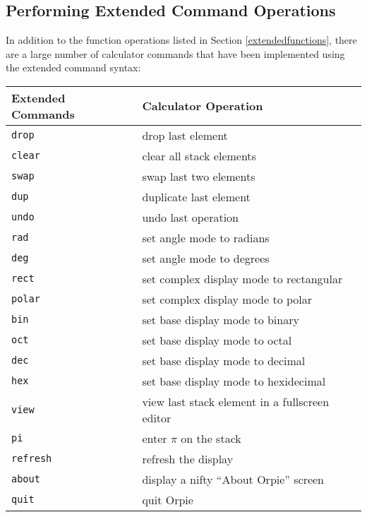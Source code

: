 \documentclass[11pt,notitlepage]{article}
\begin{document}
\subsection{Performing Extended Command Operations}
In addition to the function operations listed in Section
\ref{extendedfunctions}, there are a large number of calculator commands that
have been implemented using the extended command syntax:
\begin{center}
   \begin{tabular}[t]{|l|l|}
      \hline Extended Commands & Calculator Operation \\
      \hline
      {\tt drop} & drop last element \\
      {\tt clear} & clear all stack elements \\
      {\tt swap} & swap last two elements \\
      {\tt dup} & duplicate last element \\
      {\tt undo} & undo last operation \\
      {\tt rad} & set angle mode to radians \\
      {\tt deg} & set angle mode to degrees \\
      {\tt rect} & set complex display mode to rectangular \\
      {\tt polar} & set complex display mode to polar \\
      {\tt bin} & set base display mode to binary \\
      {\tt oct} & set base display mode to octal \\
      {\tt dec} & set base display mode to decimal \\
      {\tt hex} & set base display mode to hexidecimal \\
      {\tt view} & view last stack element in a fullscreen editor \\
      {\tt pi} & enter $\pi$ on the stack \\
      {\tt refresh} & refresh the display \\
      {\tt about} & display a nifty ``About Orpie'' screen \\
      {\tt quit} & quit Orpie \\
      \hline
   \end{tabular}
\end{center}
\end{document}
